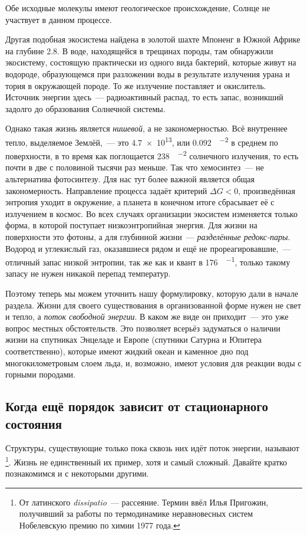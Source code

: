 Обе исходные молекулы имеют геологическое происхождение, Солнце не участвует в данном процессе.

Другая подобная экосистема найдена в золотой шахте Мпоненг в Южной Африке на глубине \qty{2,8}{\ruKm}. В воде, находящейся в трещинах породы, там обнаружили экосистему, состоящую практически из одного вида бактерий, которые живут на водороде, образующемся при разложении воды в результате излучения урана и тория в окружающей породе. То же излучение поставляет и окислитель. Источник энергии здесь~--- радиоактивный распад, то есть запас, возникший задолго до образования Солнечной системы.

Однако такая жизнь является \emph{нишевой}, а не закономерностью. Всё внутреннее тепло, выделяемое Землёй,~--- это \qty{4,7e13}{\ruW}, или \qty{0,092}{\ruW\per\ruM\squared} в среднем по поверхности, в то время как поглощается \qty{238}{\ruW\per\ruM\squared} солнечного излучения, то есть почти в две с половиной тысячи раз меньше. Так что хемосинтез~--- не альтернатива фотосинтезу. Для нас тут более важной является общая закономерность. Направление процесса задаёт критерий $\Delta G < 0$, произведённая энтропия уходит в окружение, а планета в конечном итоге сбрасывает её с излучением в космос. Во всех случаях организации экосистем изменяется только форма, в которой поступает низкоэнтропийная энергия. Для жизни на поверхности это фотоны, а для глубинной жизни~--- \emph{разделённые редокс-пары}. Водород и углекислый газ, оказавшиеся рядом и ещё не прореагировавшие,~--- отличный запас низкой энтропии, так же как и квант в \qty{176}{\ruKJ\per\ruMole}, только такому запасу не нужен никакой перепад температур.

Поэтому теперь мы можем уточнить нашу формулировку, которую дали в начале раздела. Жизни для своего существования в организованной форме нужен не свет и тепло, а \emph{поток свободной энергии}. В каком же виде он приходит~--- это уже вопрос местных обстоятельств. Это позволяет всерьёз задуматься о наличии жизни на спутниках Энцеладе и Европе (спутники Сатурна и Юпитера соответственно), которые имеют жидкий океан и каменное дно под многокилометровым слоем льда, и, возможно, имеют условия для реакции воды с горными породами.

\subsection*{Когда ещё порядок зависит от стационарного состояния}

Структуры, существующие только пока сквозь них идёт поток энергии, называют \footnote{От латинского \emph{dissipatio}~--- рассеяние. Термин ввёл Илья Пригожин, получивший за работы по термодинамике неравновесных систем Нобелевскую премию по химии 1977 года.}. Жизнь не единственный их пример, хотя и самый сложный. Давайте кратко познакомимся и с некоторыми другими.

